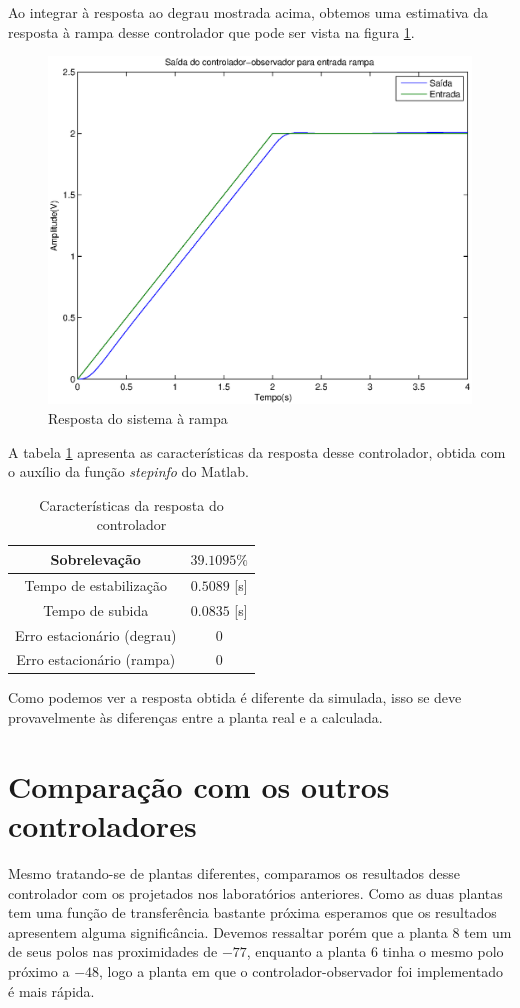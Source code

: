 \documentclass{article}
\begin{document}
Ao integrar à resposta ao degrau mostrada acima, obtemos uma estimativa da resposta à rampa desse controlador que pode ser vista na figura \ref{fig:yrSISR}.
\begin{figure}[H]
	\centering
	\includegraphics[width=0.8\linewidth]{../yrSISR}
	\caption{Resposta do sistema à rampa}
	\label{fig:yrSISR}
\end{figure}

A tabela \ref{tab:stepinfoSIS} apresenta as características da resposta desse controlador, obtida com o auxílio da função \textit{stepinfo} do Matlab.
\begin{table}[H]
	\centering
	\caption{Características da resposta do controlador}
	\label{tab:stepinfoSIS}
	\begin{tabular}{|c|c|}
		\hline Sobrelevação 				& $39.1095\%$ \\ 
		\hline Tempo de estabilização 		& $0.5089$ [s]\\ 
		\hline Tempo de subida				& $0.0835$ [s]\\ 
		\hline Erro estacionário (degrau) 	& $0$\\ 
		\hline Erro estacionário (rampa) 	& $0$\\ 
		\hline 
	\end{tabular} 
\end{table}
Como podemos ver a resposta obtida é diferente da simulada, isso se deve provavelmente às diferenças entre a planta real e a calculada. 
\section{Comparação com os outros controladores}

Mesmo tratando-se de plantas diferentes, comparamos os resultados desse controlador com os projetados nos laboratórios anteriores. Como as duas plantas tem uma função de transferência bastante próxima esperamos que os resultados apresentem alguma significância. Devemos ressaltar porém que a planta $8$ tem um de seus polos nas proximidades de $-77$, enquanto a planta $6$ tinha o mesmo polo próximo a $-48$, logo a planta em que o controlador-observador foi implementado é mais rápida.
\end{document}
